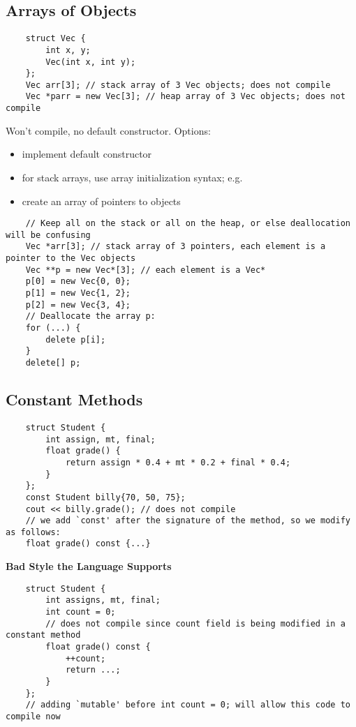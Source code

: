 \subsection{Arrays of Objects}
\begin{lstlisting}
    struct Vec {
        int x, y;
        Vec(int x, int y);
    };
    Vec arr[3]; // stack array of 3 Vec objects; does not compile
    Vec *parr = new Vec[3]; // heap array of 3 Vec objects; does not compile
\end{lstlisting}
Won't compile, no default constructor. Options:
\begin{itemize}
    \item implement default constructor
    \item for stack arrays, use array initialization syntax; e.g.
    \item create an array of pointers to objects
\end{itemize}
\begin{lstlisting}
    // Keep all on the stack or all on the heap, or else deallocation will be confusing
    Vec *arr[3]; // stack array of 3 pointers, each element is a pointer to the Vec objects
    Vec **p = new Vec*[3]; // each element is a Vec*
    p[0] = new Vec{0, 0};
    p[1] = new Vec{1, 2};
    p[2] = new Vec{3, 4};
    // Deallocate the array p:
    for (...) {
        delete p[i];
    }
    delete[] p;
\end{lstlisting}

\subsection{Constant Methods}
\begin{lstlisting}
    struct Student {
        int assign, mt, final;
        float grade() {
            return assign * 0.4 + mt * 0.2 + final * 0.4;
        }
    };
    const Student billy{70, 50, 75};
    cout << billy.grade(); // does not compile
    // we add `const' after the signature of the method, so we modify as follows:
    float grade() const {...}
\end{lstlisting}

\textbf{Bad Style the Language Supports}
\begin{lstlisting}
    struct Student {
        int assigns, mt, final;
        int count = 0;
        // does not compile since count field is being modified in a constant method
        float grade() const {
            ++count;
            return ...;
        }
    };
    // adding `mutable' before int count = 0; will allow this code to compile now
\end{lstlisting}

